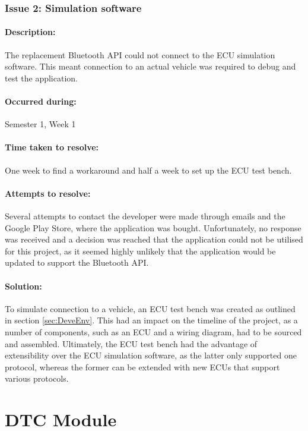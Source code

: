		\subsubsection{Issue 2: Simulation software}{
			\paragraph{Description:}
			The replacement Bluetooth API could not connect to the ECU simulation software. This meant connection to an actual vehicle was required to debug and test the application.
			
			\paragraph{Occurred during:}
			Semester 1, Week 1
			\paragraph{Time taken to resolve:}
			One week to find a workaround and half a week to set up the ECU test bench.
			\paragraph{Attempts to resolve:}
			Several attempts to contact the developer were made through emails and the Google Play Store, where the application was bought. Unfortunately, no response was received and a decision was reached that the application could not be utilised for this project, as it seemed highly unlikely that the application would be updated to support the Bluetooth API. 
			\paragraph{Solution:}
			To simulate connection to a vehicle, an ECU test bench was created as outlined in section \ref{sec:DeveEnv}. This had an impact on the timeline of the project, as a number of components, such as an ECU and a wiring diagram, had to be sourced and assembled. Ultimately, the ECU test bench had the advantage of extensibility over the ECU simulation software, as the latter only supported one protocol, whereas the former can be extended with new ECUs that support various protocols.
		}
		\label{ssec:SimSoftware}		

\section{DTC Module}
